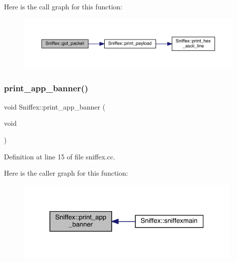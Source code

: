 Here is the call graph for this function\+:\nopagebreak
\begin{figure}[H]
\begin{center}
\leavevmode
\includegraphics[width=350pt]{class_sniffex_a3d4ef3c90e55035eadca2d577004cd14_cgraph}
\end{center}
\end{figure}
\mbox{\label{class_sniffex_ab32951f576e7cd62caf4fe1c5b085b4e}} 
\subsubsection{\texorpdfstring{print\+\_\+app\+\_\+banner()}{print\_app\_banner()}}
{\footnotesize\ttfamily void Sniffex\+::print\+\_\+app\+\_\+banner (\begin{DoxyParamCaption}\item[{void}]{ }\end{DoxyParamCaption})}



Definition at line 15 of file sniffex.\+cc.

Here is the caller graph for this function\+:\nopagebreak
\begin{figure}[H]
\begin{center}
\leavevmode
\includegraphics[width=313pt]{class_sniffex_ab32951f576e7cd62caf4fe1c5b085b4e_icgraph}
\end{center}
\end{figure}
\mbox{\label{class_sniffex_aea81794fe2ac6e2b857eef01c3b109e5}} 
